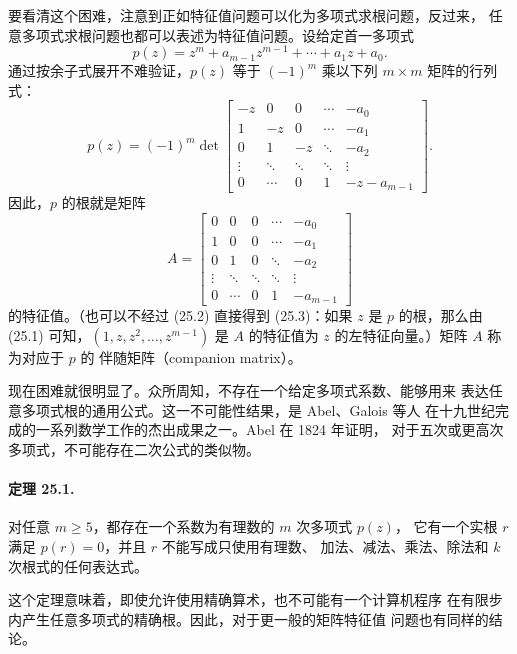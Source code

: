 \documentclass[UTF8,fontset=none,12pt]{ctexart}
\begin{document}
要看清这个困难，注意到正如特征值问题可以化为多项式求根问题，反过来，
任意多项式求根问题也都可以表述为特征值问题。设给定首一多项式
\begin{equation}
 p(z)=z^m+a_{m-1}z^{m-1}+\cdots+a_1z+a_0.
 \tag{25.1}
\end{equation}
通过按余子式展开不难验证，$p(z)$ 等于 $(-1)^m$ 乘以下列
$m\times m$ 矩阵的行列式：
\begin{equation}
 p(z)=(-1)^m\det\begin{bmatrix}
 -z&0&0&\cdots&-a_0\\
 1&-z&0&\cdots&-a_1\\
 0&1&-z&\ddots&-a_2\\
 \vdots&\ddots&\ddots&\ddots&\vdots\\
 0&\cdots&0&1&-z-a_{m-1}
 \end{bmatrix}.
 \tag{25.2}
\end{equation}
因此，$p$ 的根就是矩阵
\begin{equation}
 A=\begin{bmatrix}
 0&0&0&\cdots&-a_0\\
 1&0&0&\cdots&-a_1\\
 0&1&0&\ddots&-a_2\\
 \vdots&\ddots&\ddots&\ddots&\vdots\\
 0&\cdots&0&1&-a_{m-1}
 \end{bmatrix}
 \tag{25.3}
\end{equation}
的特征值。（也可以不经过 (25.2) 直接得到 (25.3)：如果 $z$ 是
$p$ 的根，那么由 (25.1) 可知，$(1,z,z^2,\ldots,z^{m-1})$ 是
$A$ 的特征值为 $z$ 的左特征向量。）矩阵 $A$ 称为对应于 $p$ 的
伴随矩阵（companion matrix）。

现在困难就很明显了。众所周知，不存在一个给定多项式系数、能够用来
表达任意多项式根的通用公式。这一不可能性结果，是 Abel、Galois 等人
在十九世纪完成的一系列数学工作的杰出成果之一。Abel 在 1824 年证明，
对于五次或更高次多项式，不可能存在二次公式的类似物。

\paragraph{定理 25.1.}
对任意 $m\ge 5$，都存在一个系数为有理数的 $m$ 次多项式 $p(z)$，
它有一个实根 $r$ 满足 $p(r)=0$，并且 $r$ 不能写成只使用有理数、
加法、减法、乘法、除法和 $k$ 次根式的任何表达式。

这个定理意味着，即使允许使用精确算术，也不可能有一个计算机程序
在有限步内产生任意多项式的精确根。因此，对于更一般的矩阵特征值
问题也有同样的结论。
\end{document}

